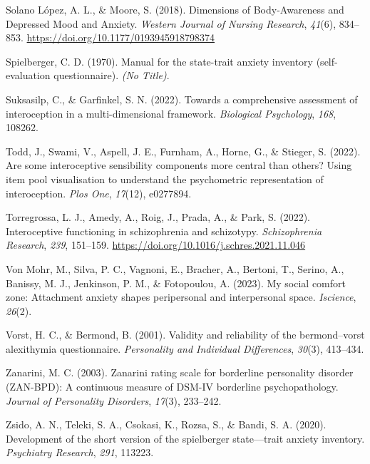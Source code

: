 \documentclass[
  man,
  floatsintext,
  longtable,
  nolmodern,
  notxfonts,
  notimes,
  colorlinks=true,linkcolor=blue,citecolor=blue,urlcolor=blue]{apa7}
\newlength{\cslhangindent}
\newenvironment{CSLReferences}[2] %
 {\begin{list}{}{%
  \setlength{\itemindent}{0pt}
  \setlength{\leftmargin}{0pt}
  \setlength{\parsep}{0pt}
  \ifodd #1
   \setlength{\leftmargin}{\cslhangindent}
   \setlength{\itemindent}{-1\cslhangindent}
  \fi
  \setlength{\itemsep}{#2\baselineskip}}}
 {\end{list}}
\begin{document}
\begin{CSLReferences}{1}{0}
Solano López, A. L., \& Moore, S. (2018). Dimensions of Body-Awareness
and Depressed Mood and Anxiety. \emph{Western Journal of Nursing
Research}, \emph{41}(6), 834--853.
\url{https://doi.org/10.1177/0193945918798374}

Spielberger, C. D. (1970). Manual for the state-trait anxiety inventory
(self-evaluation questionnaire). \emph{(No Title)}.

Suksasilp, C., \& Garfinkel, S. N. (2022). Towards a comprehensive
assessment of interoception in a multi-dimensional framework.
\emph{Biological Psychology}, \emph{168}, 108262.

Todd, J., Swami, V., Aspell, J. E., Furnham, A., Horne, G., \& Stieger,
S. (2022). Are some interoceptive sensibility components more central
than others? Using item pool visualisation to understand the
psychometric representation of interoception. \emph{Plos One},
\emph{17}(12), e0277894.

Torregrossa, L. J., Amedy, A., Roig, J., Prada, A., \& Park, S. (2022).
Interoceptive functioning in schizophrenia and schizotypy.
\emph{Schizophrenia Research}, \emph{239}, 151--159.
\url{https://doi.org/10.1016/j.schres.2021.11.046}

Von Mohr, M., Silva, P. C., Vagnoni, E., Bracher, A., Bertoni, T.,
Serino, A., Banissy, M. J., Jenkinson, P. M., \& Fotopoulou, A. (2023).
My social comfort zone: Attachment anxiety shapes peripersonal and
interpersonal space. \emph{Iscience}, \emph{26}(2).

Vorst, H. C., \& Bermond, B. (2001). Validity and reliability of the
bermond--vorst alexithymia questionnaire. \emph{Personality and
Individual Differences}, \emph{30}(3), 413--434.

Zanarini, M. C. (2003). Zanarini rating scale for borderline personality
disorder (ZAN-BPD): A continuous measure of DSM-IV borderline
psychopathology. \emph{Journal of Personality Disorders}, \emph{17}(3),
233--242.

Zsido, A. N., Teleki, S. A., Csokasi, K., Rozsa, S., \& Bandi, S. A.
(2020). Development of the short version of the spielberger
state---trait anxiety inventory. \emph{Psychiatry Research}, \emph{291},
113223.

\end{CSLReferences}
\end{document}
